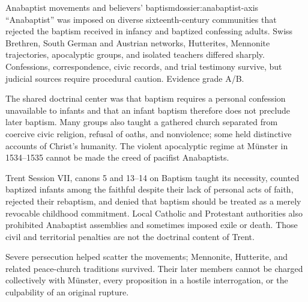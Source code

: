 \begin{heresydossier}{Anabaptist movements and believers' baptism}{dossier:anabaptist-axis}
\objectfield ``Anabaptist'' was imposed on diverse sixteenth-century communities that rejected the baptism received in infancy and baptized confessing adults. Swiss Brethren, South German and Austrian networks, Hutterites, Mennonite trajectories, apocalyptic groups, and isolated teachers differed sharply. Confessions, correspondence, civic records, and trial testimony survive, but judicial sources require procedural caution. Evidence grade A/B.

\propositionfield The shared doctrinal center was that baptism requires a personal confession unavailable to infants and that an infant baptism therefore does not preclude later baptism. Many groups also taught a gathered church separated from coercive civic religion, refusal of oaths, and nonviolence; some held distinctive accounts of Christ's humanity. The violent apocalyptic regime at M\"unster in 1534--1535 cannot be made the creed of pacifist Anabaptists.

\responsefield Trent Session VII, canons 5 and 13--14 on Baptism taught its necessity, counted baptized infants among the faithful despite their lack of personal acts of faith, rejected their rebaptism, and denied that baptism should be treated as a merely revocable childhood commitment. Local Catholic and Protestant authorities also prohibited Anabaptist assemblies and sometimes imposed exile or death. Those civil and territorial penalties are not the doctrinal content of Trent.

\aftermathfield Severe persecution helped scatter the movements; Mennonite, Hutterite, and related peace-church traditions survived. Their later members cannot be charged collectively with M\"unster, every proposition in a hostile interrogation, or the culpability of an original rupture.
\end{heresydossier}

